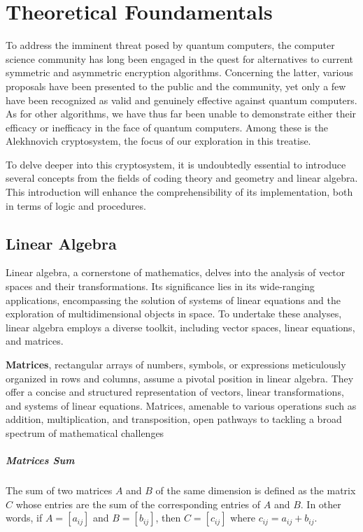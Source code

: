 \section{Theoretical Foundamentals}
To address the imminent threat posed by quantum computers, the computer science community has long been engaged in the quest for alternatives to current symmetric and asymmetric encryption algorithms. Concerning the latter, various proposals have been presented to the public and the community, yet only a few have been recognized as valid and genuinely effective against quantum computers. As for other algorithms, we have thus far been unable to demonstrate either their efficacy or inefficacy in the face of quantum computers. Among these is the Alekhnovich cryptosystem, the focus of our exploration in this treatise.

To delve deeper into this cryptosystem, it is undoubtedly essential to introduce several concepts from the fields of coding theory and geometry and linear algebra. This introduction will enhance the comprehensibility of its implementation, both in terms of logic and procedures.

\subsection{Linear Algebra}
Linear algebra, a cornerstone of mathematics, delves into the analysis of vector spaces and their transformations. Its significance lies in its wide-ranging applications, encompassing the solution of systems of linear equations and the exploration of multidimensional objects in space. To undertake these analyses, linear algebra employs a diverse toolkit, including vector spaces, linear equations, and matrices.

\textbf{Matrices}, rectangular arrays of numbers, symbols, or expressions meticulously organized in rows and columns, assume a pivotal position in linear algebra. They offer a concise and structured representation of vectors, linear transformations, and systems of linear equations. Matrices, amenable to various operations such as addition, multiplication, and transposition, open pathways to tackling a broad spectrum of mathematical challenges

\subparagraph{Matrices Sum}
The sum of two matrices $A$ and $B$ of the same dimension is defined as the matrix $C$ whose entries are the sum of the corresponding entries of $A$ and $B$. In other words, if $A = [a_{ij}]$ and $B = [b_{ij}]$, then $C = [c_{ij}]$ where $c_{ij} = a_{ij} + b_{ij}$.

